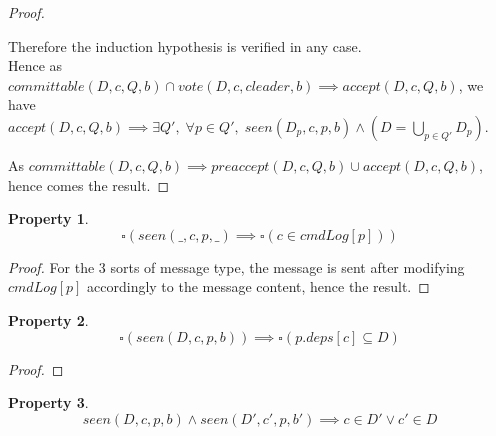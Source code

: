 \documentclass[a4paper]{article}
\theoremstyle{definition}
\theoremstyle{plain}
\newtheorem{property}{Property}
\begin{document}
\begin{proof}
\begin{case}
\begin{case}
\begin{case}
        \end{case}
    \end{case}
    Therefore the induction hypothesis is verified in any case. \\
    Hence as $committable(D,c,Q,b) \cap vote(D,c,cleader,b) \implies accept(D,c,Q,b)$, we have $ accept(D,c,Q,b) \implies \exists Q', \; \forall p \in Q', \; seen(D_p,c,p,b) \wedge (D = \bigcup_{p \in Q'}{D_p})$.

\end{case}
As $committable(D,c,Q,b) \implies preaccept(D,c,Q,b) \cup accept(D,c,Q,b)$, hence comes the result.
\end{proof}

\begin{property}
\begin{equation*}
    \square(seen(\_,c,p,\_) \implies \square(c \in cmdLog[p]))
\end{equation*}
\end{property}

\begin{proof}
For the 3 sorts of message type, the message is sent after modifying $cmdLog[p]$ accordingly to the message content, hence the result.
\end{proof}


\begin{property}
\begin{equation*}
    \square(seen(D,c,p,b)) \implies \square(p.deps[c] \subseteq D)
\end{equation*}
\end{property}

\begin{proof}
\end{proof}

\begin{property}
\begin{equation*}
    seen(D,c,p,b) \wedge seen(D',c',p,b') \implies c \in D' \vee c' \in D
\end{equation*}
\end{property}
\end{document}
